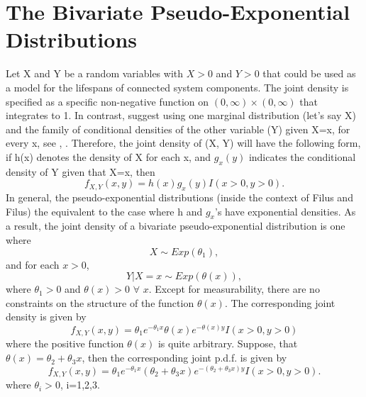 \documentclass[12pt]{article}    %
\numberwithin{equation}{section}
\begin{document}
	
	
\section{The Bivariate Pseudo-Exponential Distributions}
Let X and Y be a random variables with $X>0$ and $Y>0$ that could be used as a model for the lifespans of connected system components. The joint density is specified as a specific non-negative function on $(0, \infty) \times (0, \infty)$ that integrates to 1. In contrast, \cite{FF2007} suggest using one marginal distribution (let's say X) and the family of conditional densities of the other variable (Y) given X=x, for every x, see \cite{BEJ99}, \cite{FF2006}. Therefore, the joint density of (X, Y) will have the following form, if h(x) denotes the density of X for each x, and $g_x(y)$ indicates the conditional density of Y given that X=x, then
\begin{equation}\label{eq1}
f_{X,Y}(x,y) = h(x)g_x(y)I(x>0, y>0).
\end{equation}
In general, the pseudo-exponential distributions (inside the context of Filus and Filus) the equivalent to the case where h and $g_x$'s have exponential densities. As a result, the joint density of a bivariate pseudo-exponential distribution is one where
\begin{equation}\label{eq2}
X \sim Exp(\theta_1),
\end{equation}
and for each $x>0$,
\begin{equation}\label{eq3}
Y|X=x \sim Exp(\theta(x)),
\end{equation}
where $\theta_1>0$ and $\theta(x)>0$ $\forall$ $x$. Except for measurability, there are no constraints on the structure of the function $\theta(x)$. The corresponding joint density is given by \begin{equation}\label{eq4}
f_{X,Y}(x,y) = \theta_1e^{-\theta_1x}\theta(x)e^{-\theta(x)y}I(x>0, y>0)
\end{equation}
where the positive function $\theta(x)$ is quite arbitrary. Suppose,
that $\theta(x) = \theta_2 + \theta_3x$, then the corresponding joint p.d.f. is given by
\begin{equation}\label{eq5}
f_{X,Y}(x,y) = \theta_1e^{-\theta_1x}(\theta_2 + \theta_3x)e^{-(\theta_2 + \theta_3x)y}I(x>0, y>0).
\end{equation}
where $\theta_i>0$, i=1,2,3.
\end{document}
